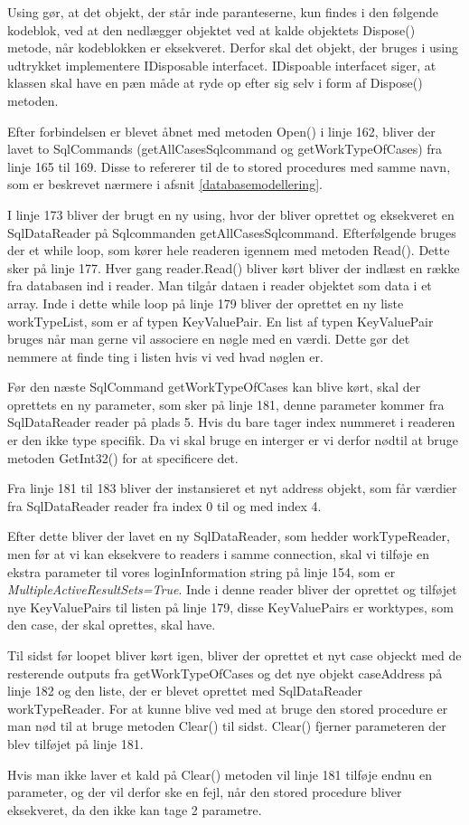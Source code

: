 Using gør, at det objekt, der står inde paranteserne, kun findes i den følgende kodeblok, ved at den nedlægger objektet ved at kalde objektets Dispose() metode, når kodeblokken er eksekveret.
Derfor skal det objekt, der bruges i using udtrykket implementere IDisposable interfacet.\cite{using} IDispoable interfacet siger, at klassen skal have en pæn måde at ryde op efter sig selv i form af Dispose() metoden.\cite{idisposable}

Efter forbindelsen er blevet åbnet med metoden Open() i linje 162, bliver der lavet to SqlCommands (getAllCasesSqlcommand og getWorkTypeOfCases) fra linje 165 til 169.
Disse to refererer til de to stored procedures med samme navn, som er beskrevet nærmere i afsnit \ref{databasemodellering}.

I linje 173 bliver der brugt en ny using, hvor der bliver oprettet og eksekveret en SqlDataReader på Sqlcommanden getAllCasesSqlcommand.
Efterfølgende bruges der et while loop, som kører hele readeren igennem med metoden Read().
Dette sker på linje 177.
Hver gang reader.Read() bliver kørt bliver der indlæst en række fra databasen ind i reader.
Man tilgår dataen i reader objektet som data i et array.
Inde i dette while loop på linje 179 bliver der oprettet en ny liste workTypeList, som er af typen KeyValuePair.
En list af typen KeyValuePair bruges når man gerne vil associere en nøgle med en værdi.
Dette gør det nemmere at finde ting i listen hvis vi ved hvad nøglen er.

Før den næste SqlCommand getWorkTypeOfCases kan blive kørt, skal der oprettets en ny parameter, som sker på linje 181, denne parameter kommer fra SqlDataReader reader på plads 5.
Hvis du bare tager index nummeret i readeren er den ikke type specifik.
Da vi skal bruge en interger er vi derfor nødtil at bruge metoden GetInt32() for at specificere det.\cite{sqlreader}

Fra linje 181 til 183 bliver der instansieret et nyt address objekt, som får værdier fra SqlDataReader reader fra index 0 til og med index 4.

Efter dette bliver der lavet en ny SqlDataReader, som hedder workTypeReader, men før at vi kan eksekvere to readers i samme connection, skal vi tilføje en ekstra parameter til vores loginInformation string på linje 154, som er \textit{MultipleActiveResultSets=True}.
Inde i denne reader bliver der oprettet og tilføjet nye KeyValuePairs til listen på linje 179, disse KeyValuePairs er worktypes, som den case, der skal oprettes, skal have.

Til sidst før loopet bliver kørt igen, bliver der oprettet et nyt case objeckt med de resterende outputs fra getWorkTypeOfCases og det nye objekt caseAddress på linje 182 og den liste, der er blevet oprettet med SqlDataReader workTypeReader.
For at kunne blive ved med at bruge den stored procedure er man nød til at bruge metoden Clear() til sidst.
Clear() fjerner parameteren der blev tilføjet på linje 181.

Hvis man ikke laver et kald på Clear() metoden vil linje 181 tilføje endnu en parameter, og der vil derfor ske en fejl, når den stored procedure bliver eksekveret, da den ikke kan tage 2 parametre.
